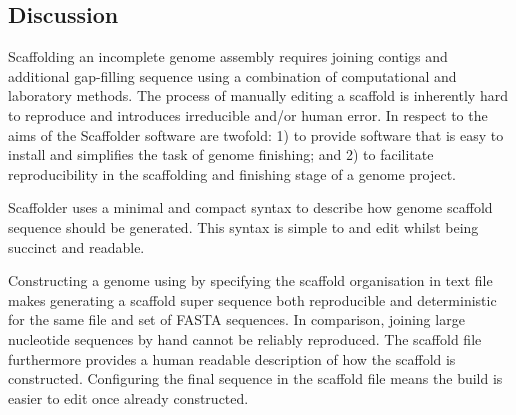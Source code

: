 \documentclass[10pt]{bmc_article}
\newenvironment{bmcformat}{\begin{raggedright}\baselineskip20pt\sloppy\setboolean{publ}{false}}{\end{raggedright}\baselineskip20pt\sloppy}
\begin{document}
\begin{bmcformat}
\clearpage

\section*{Discussion} %

Scaffolding an incomplete genome assembly requires joining contigs and
additional gap-filling sequence using a combination of computational and
laboratory methods. The process of manually editing a scaffold is inherently
hard to reproduce and introduces irreducible
 and/or human error. In respect to  the aims of the Scaffolder software are twofold: 1) to provide
software that is easy to install and simplifies the task of genome finishing;
and 2) to facilitate reproducibility in the scaffolding and finishing stage of
a genome project. \pb

 Scaffolder  uses a minimal and
compact syntax to describe how  genome scaffold sequence should
be generated. This syntax is simple to  and edit
whilst being succinct and readable.  \pb

Constructing a genome using by specifying the scaffold organisation in text
file makes generating a scaffold super sequence both reproducible and
deterministic for the same file and set of FASTA sequences. In comparison,
joining large nucleotide sequences by hand cannot be reliably reproduced. The
scaffold file furthermore provides a human readable description of how the
scaffold is constructed. Configuring the final sequence in the scaffold file
means the build is easier to edit once already constructed. \pb


\end{bmcformat}
\end{document}
